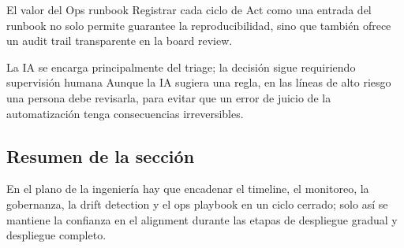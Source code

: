 \begin{knowledgebox}{El valor del Ops runbook}
Registrar cada ciclo de Act como una entrada del runbook no solo permite guarantee la reproducibilidad, sino que también ofrece un audit trail transparente en la board review.
\end{knowledgebox}

\begin{warningbox}{La IA se encarga principalmente del triage; la decisión sigue requiriendo supervisión humana}
Aunque la IA sugiera una regla, en las líneas de alto riesgo una persona debe revisarla, para evitar que un error de juicio de la automatización tenga consecuencias irreversibles.
\end{warningbox}

\subsection{Resumen de la sección}

En el plano de la ingeniería hay que encadenar el timeline, el monitoreo, la gobernanza, la drift detection y el ops playbook en un ciclo cerrado; solo así se mantiene la confianza en el alignment durante las etapas de despliegue gradual y despliegue completo.
